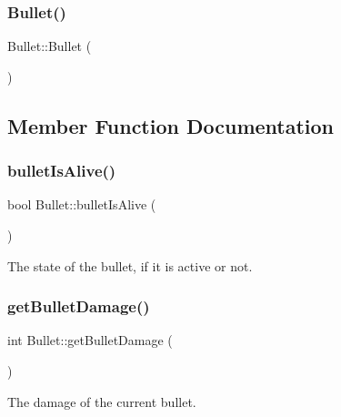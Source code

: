\subsubsection{\texorpdfstring{Bullet()}{Bullet()}\hspace{0.1cm}{\footnotesize\ttfamily [2/2]}}
{\footnotesize\ttfamily Bullet\+::\+Bullet (\begin{DoxyParamCaption}{ }\end{DoxyParamCaption})\hspace{0.3cm}{\ttfamily [private]}}



\subsection{Member Function Documentation}
\mbox{\label{class_bullet_a103ff9146dce215f15ca0c4282a5a8cf}} 
\subsubsection{\texorpdfstring{bullet\+Is\+Alive()}{bulletIsAlive()}}
{\footnotesize\ttfamily bool Bullet\+::bullet\+Is\+Alive (\begin{DoxyParamCaption}{ }\end{DoxyParamCaption})}



The state of the bullet, if it is active or not. 

\mbox{\label{class_bullet_a588467f138b5c65d018bf04ab2ca2931}} 
\subsubsection{\texorpdfstring{get\+Bullet\+Damage()}{getBulletDamage()}}
{\footnotesize\ttfamily int Bullet\+::get\+Bullet\+Damage (\begin{DoxyParamCaption}{ }\end{DoxyParamCaption})}



The damage of the current bullet. 

\mbox{\label{class_bullet_a22bc1ccf27f5ff8fe939616ca10b1489}} 
